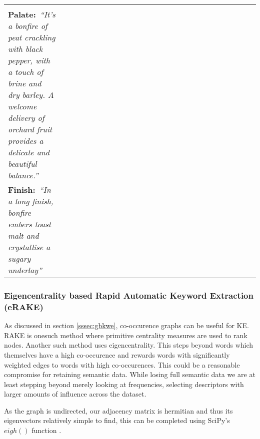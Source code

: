 \begin{table}
\begin{tabular}{p{0.2\linewidth} p{0.8\linewidth}}
\begin{minipage}[t]{0.8\columnwidth}
{            }\\
            \textbf{Palate:}\textit{~``It's a bonfire of peat crackling with black pepper, with a touch of brine 
            and dry barley. A welcome delivery of orchard fruit provides a delicate and beautiful balance.''
            }\\
            \textbf{Finish:}~\textit{``In a long finish, bonfire embers toast malt and crystallise a sugary underlay''
            }\end{minipage}                                                                                                                                                                                                                                                    \\
        \toprule
    \end{tabular}
\end{table}

\subsubsection{Eigencentrality based Rapid Automatic Keyword Extraction (eRAKE)}\label{ssec:erake}
As discussed in section \ref{sssec:gbkwe}, co-occurence graphs can be useful for KE.  RAKE is onesuch method where primitive
centrality measures are used to rank nodes.  Another such method uses eigencentrality.  This steps beyond words which
themselves have a high co-occurence and rewards words with significantly weighted edges to words with high co-occurences.
This could be a reasonable compromise for retaining semantic data.  While losing full semantic data we are
at least stepping beyond merely looking at frequencies, selecting descriptors with larger amounts of influence across
the dataset.

As the graph is undirected, our adjacency matrix is hermitian and thus its eigenvectors relatively simple to find,
this can be completed using SciPy's $eigh()$ function \cite{hubbard_2020, 2020NumPy}.